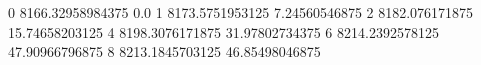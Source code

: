 0 8166.32958984375 0.0
1 8173.5751953125 7.24560546875
2 8182.076171875 15.74658203125
4 8198.3076171875 31.97802734375
6 8214.2392578125 47.90966796875
8 8213.1845703125 46.85498046875
